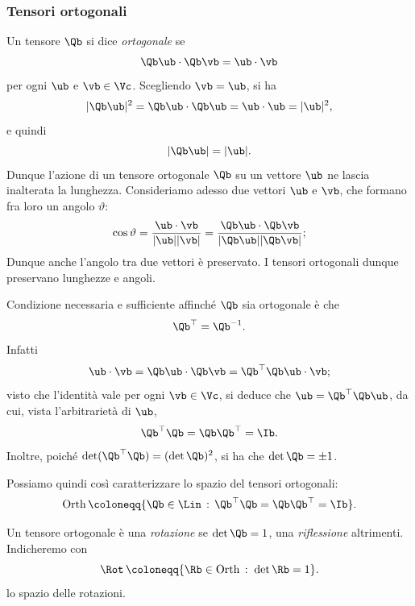\subsubsection{Tensori ortogonali}
Un tensore $\Qb$ si dice \textit{ortogonale} se 
\begin{equation}
\Qb \ub \cdot \Qb \vb =\ub \cdot \vb
\end{equation}
per ogni $\ub$ e $\vb \in \Vc$.
Scegliendo $\vb =\ub$, si ha
\begin{equation}
|\Qb \ub|^2 =\Qb \ub\cdot\Qb \ub =\ub \cdot\ub =|\ub|^2,
\end{equation}
e quindi 
\begin{equation}
	|\Qb \ub|=|\ub|.
\end{equation}
Dunque l'azione di un tensore ortogonale $\Qb$ su un vettore $\ub$ ne lascia inalterata la lunghezza. Consideriamo adesso due vettori $\ub$ e $\vb$, che formano fra loro un angolo $\vartheta$:
\begin{equation}
	\cos\vartheta=\frac{\ub \cdot \vb}{|\ub||\vb|}=\frac{\Qb \ub \cdot \Qb \vb}{|\Qb \ub ||\Qb \vb |};
\end{equation}
Dunque anche l'angolo tra due vettori è preservato. I tensori ortogonali dunque preservano lunghezze e angoli.

Condizione necessaria e sufficiente affinché $\Qb$ sia ortogonale è che
\begin{equation}
	\Qb^\top = \Qb ^{-1}.
\end{equation}
Infatti
\begin{equation}
	\ub \cdot \vb =\Qb \ub \cdot\Qb \vb =\Qb ^\top \Qb \ub \cdot \vb;
\end{equation}
visto che l'identità vale per ogni $\vb \in \Vc$, si deduce che $\ub = \Qb ^\top \Qb \ub$, da cui, vista l'arbitrarietà di $\ub$,
\begin{equation}
\Qb ^\top \Qb =\Qb \Qb ^\top =\Ib.
\end{equation}
Inoltre, poiché $\det (\Qb^\top \Qb)=(\det \Qb)^2$, si ha che $\det \Qb=\pm 1$.

Possiamo quindi così caratterizzare lo spazio del tensori ortogonali:
\begin{equation}
	\operatorname{Orth}\coloneqq \{\Qb \in \Lin \,:\, \Qb ^\top \Qb =\Qb \Qb ^\top =\Ib\}.
\end{equation}

Un tensore ortogonale è una \textit{rotazione} se $\det \Qb =1$, una \textit{riflessione} altrimenti.
Indicheremo con
\begin{equation}
\operatorname{\Rot}\coloneqq \{\Rb \in \operatorname{Orth}\,:\; \det \Rb =1  \}.
\end{equation}
lo spazio delle rotazioni.

